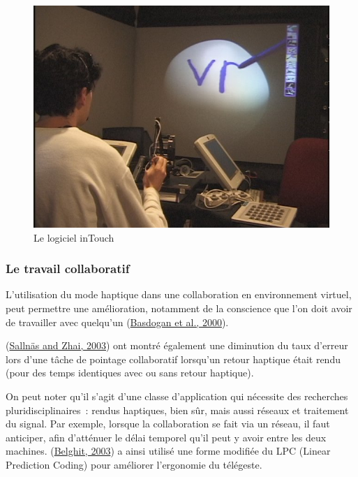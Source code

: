 \documentclass[
]{book}
\begin{document}
\begin{figure}
\centering
\includegraphics{img/systemSetup.jpg}
\caption{\label{fig:intouch}Le logiciel inTouch}
\end{figure}

\hypertarget{le-travail-collaboratif}{%
\subsubsection{Le travail collaboratif}\label{le-travail-collaboratif}}

L'utilisation du mode haptique dans une collaboration en environnement
virtuel, peut permettre une amélioration, notamment de la conscience que l'on
doit avoir de travailler avec quelqu'un (\protect\hyperlink{ref-basdogan2000experimental}{Basdogan et al., 2000}).

(\protect\hyperlink{ref-sallnas2003collaboration}{Sallnäs and Zhai, 2003}) ont montré
également une diminution du taux d'erreur lors d'une tâche de pointage
collaboratif lorsqu'un retour haptique était rendu (pour des temps identiques
avec ou sans retour haptique).

On peut noter qu'il s'agit d'une classe d'application qui nécessite des
recherches pluridisciplinaires~: rendus haptiques, bien sûr, mais aussi
réseaux et traitement du signal. Par exemple, lorsque la collaboration se
fait via un réseau, il faut anticiper, afin d'atténuer le délai temporel
qu'il peut y avoir entre les deux machines. (\protect\hyperlink{ref-belghit2003amelioration}{Belghit, 2003}) a ainsi utilisé une forme
modifiée du LPC (Linear Prediction Coding) pour améliorer l'ergonomie du
télégeste.
\end{document}
